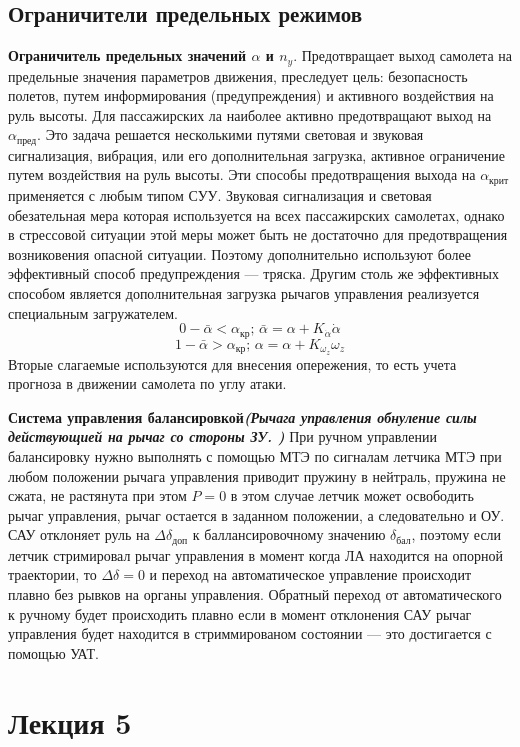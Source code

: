\documentclass{article}
\begin{document}
\subsection{Ограничители предельных режимов}
\textbf{Ограничитель предельных значений $\alpha$ и $n_y$}.
Предотвращает выход самолета на предельные значения параметров движения, преследует цель: безопасность полетов, путем информирования (предупреждения) и активного воздействия на руль высоты.
Для пассажирских ла наиболее активно предотвращают выход на $\alpha_\text{пред}$.
Это задача решается несколькими путями световая и звуковая сигнализация, вибрация, или его дополнительная загрузка, активное ограничение путем воздействия на руль высоты. 
Эти способы предотвращения выхода на $\alpha_\text{крит}$ применяется с любым типом СУУ. Звуковая сигнализация и световая обезательная мера которая используется на всех пассажирских самолетах, однако в стрессовой ситуации этой меры может быть не достаточно для предотвращения возниковения опасной ситуации. Поэтому дополнительно используют более эффективный способ предупреждения --- тряска. Другим столь же эффективных способом является дополнительная загрузка рычагов управления реализуется специальным загружателем.
\[
	0 - \bar{\alpha} < \alpha_\text{кр}; \, \bar{\alpha} = \alpha + K_{\dot{\alpha}} \dot{\alpha}
\]
\[
    1 - \bar{\alpha} > \alpha_\text{кр}; \, \alpha = \alpha + K_{\omega_z} \omega_z 
\]
Вторые слагаемые используются для внесения опережения, то есть учета прогноза в движении самолета по углу атаки.

\textbf{Система управления балансировкой\emph{(Рычага управления обнуление силы действующией на рычаг со стороны ЗУ. )}}
При ручном управлении балансировку нужно выполнять с помощью МТЭ по сигналам летчика МТЭ при любом положении рычага управления приводит пружину в нейтраль, пружина не сжата, не растянута при этом $P=0$ в этом случае летчик может освободить рычаг управления, рычаг остается в заданном положении, а следовательно и ОУ.
САУ отклоняет руль на $\Delta\delta_\text{доп}$ к баллансировочному значению $\delta_\text{бал}$, поэтому если летчик стримировал рычаг управления в момент когда ЛА находится на опорной траектории, то $\Delta\delta = 0$ и переход на автоматическое управление происходит плавно без рывков на органы управления.
Обратный переход от автоматического к ручному будет происходить плавно если в момент отклонения САУ рычаг управления будет находится в стриммированом состоянии --- это достигается с помощью УАТ.

\newpage
\section{Лекция 5}
\end{document}
